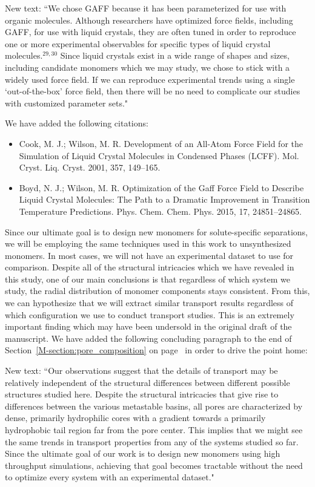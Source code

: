 \documentclass{article}
\begin{document}
\begin{enumerate}
    New text: ``We chose GAFF because it has been parameterized for use with
    organic molecules. Although researchers have optimized force fields, including
    GAFF, for use with liquid crystals, they are often tuned in order to
    reproduce one or more experimental observables for specific types of liquid 
    crystal molecules.$^{29,30}$ Since liquid crystals exist in a wide range of shapes and
    sizes, including candidate monomers which we may study, we chose to stick with
    a widely used force field. If we can reproduce experimental trends using a 
    single `out-of-the-box' force field, then there will be no need to complicate
    our studies with customized parameter sets."

    We have added the following citations:
    \begin{itemize}
    \item Cook, M. J.; Wilson, M. R. Development of an All-Atom Force Field for the Simulation
    of Liquid Crystal Molecules in Condensed Phases (LCFF). Mol. Cryst. Liq. Cryst.
    2001, 357, 149–165.
    \item Boyd, N. J.; Wilson, M. R. Optimization of the Gaff Force Field to Describe Liquid
    Crystal Molecules: The Path to a Dramatic Improvement in Transition Temperature
    Predictions. Phys. Chem. Chem. Phys. 2015, 17, 24851–24865.
    \end{itemize}

    Since our ultimate goal is to design new monomers for solute-specific
    separations, we will be employing the same techniques used in this work to
    unsynthesized monomers. In most cases, we will not have an experimental dataset
    to use for comparison. Despite all of the structural intricacies which we have
    revealed in this study, one of our main conclusions is that regardless of which
    system we study, the radial distribution of monomer components stays
    consistent. From this, we can hypothesize that we will extract similar
    transport results regardless of which configuration we use to conduct
    transport studies. This is an extremely important finding which may have
    been undersold in the original draft of the manuscript. We have added the
    following concluding paragraph to the end of
    Section~\ref{M-section:pore_composition} on
    page~\pageref{M-addition:pore_composition} in order to drive the point home:

    New text: ``Our observations suggest that the details of transport may be
    relatively independent of the structural differences between different possible
    structures studied here. Despite the structural intricacies that give rise to
    differences between the various metastable basins, all pores are characterized
    by dense, primarily hydrophilic cores with a gradient towards a primarily
    hydrophobic tail region far from the pore center. This implies that we might
    see the same trends in transport properties from any of the systems studied so
    far. Since the ultimate goal of our work is to design new monomers using high
    throughput simulations, achieving that goal becomes tractable without the need
    to optimize every system with an experimental dataset."
	

\end{enumerate}
\end{document}
